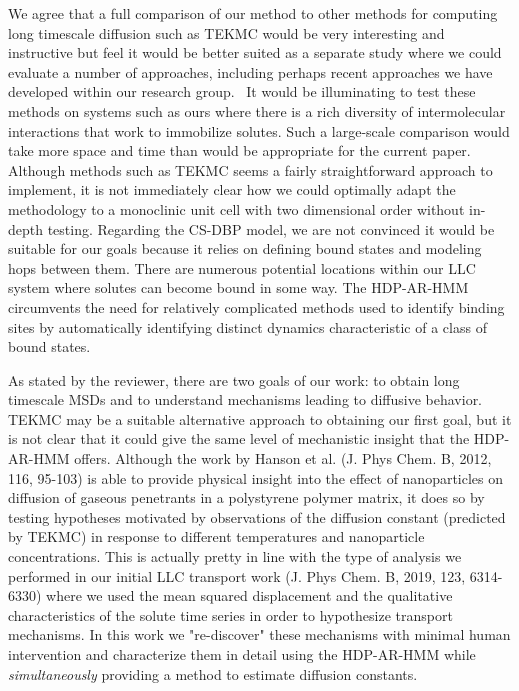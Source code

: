 \documentclass{article}
\begin{document}
\begin{enumerate}[label={Comment \theenumi :}, leftmargin=3.9\parindent]
    We agree that a full comparison of our method to other methods for computing long timescale 
    diffusion such as TEKMC would be very interesting and instructive but feel it would be better 
    suited as a separate study where we could evaluate a number of approaches, including perhaps
    recent approaches we have developed within our research group.~\cite{coscia_capturing_2020}
    It would be illuminating to test these methods on systems such as ours where there is
    a rich diversity of intermolecular interactions that work to immobilize solutes.
    Such a large-scale comparison would take more space and time than would be appropriate for 
    the current paper. Although methods such as TEKMC seems a fairly straightforward approach to
    implement, it is not immediately clear how we could optimally adapt the methodology to a 
    monoclinic unit cell with two dimensional order without in-depth testing.
    Regarding the CS-DBP model, we are not convinced it would be suitable for our goals because
    it relies on defining bound states and modeling hops between them. There are numerous potential
    locations within our LLC system where solutes can become bound in some way. The HDP-AR-HMM
    circumvents the need for relatively complicated methods used to identify binding sites 
    by automatically identifying distinct dynamics characteristic of a class of bound states. 
    
    As stated by the reviewer, there are two goals of our work: to obtain long timescale MSDs and
    to understand mechanisms leading to diffusive behavior. TEKMC may be a suitable alternative 
    approach to obtaining our first goal, but it is not clear that it could give the same level
    of mechanistic insight that the HDP-AR-HMM offers. Although the work by Hanson et al.
    (J. Phys Chem. B, 2012, 116, 95-103) is able to provide physical insight into the effect of
    nanoparticles on diffusion of gaseous penetrants in a polystyrene polymer matrix, it does so
    by testing hypotheses motivated by observations of the diffusion constant (predicted by TEKMC)
    in response to different temperatures and nanoparticle concentrations. This is actually pretty
    in line with the type of analysis we performed in our initial LLC transport work (J. Phys Chem. B, 2019, 123, 6314-6330)
    where we used the mean squared displacement and the qualitative characteristics of the solute
    time series in order to hypothesize transport mechanisms. In this work we "re-discover" these
    mechanisms with minimal human intervention and characterize them in detail using the 
    HDP-AR-HMM while \textit{simultaneously} providing a method to estimate diffusion constants.


\end{enumerate}
\end{document}
